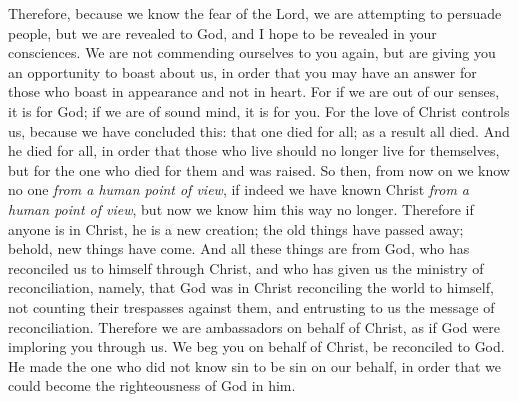 \begin{biblechapter}
 Therefore, because we know the fear of the Lord, we are attempting to persuade people, but we are revealed to God, and I hope to be revealed in your consciences.
\verse We are not commending ourselves to you again, but are giving you an opportunity to boast about us, in order that you may have an answer for those who boast in appearance and not in heart.
\verse For if we are out of our senses, it is for God; if we are of sound mind, it is for you.
\verse For the love of Christ controls us, because we have concluded this: that one died for all; as a result all died.
\verse And he died for all, in order that those who live should no longer live for themselves, but for the one who died for them and was raised.
\verse So then, from now on we know no one \textit{from a human point of view}, if indeed we have known Christ \textit{from a human point of view}, but now we know him this way no longer.
\verse Therefore if anyone is in Christ, he is a new creation; the old things have passed away; behold, new things have come.
\verse And all these things are from God, who has reconciled us to himself through Christ, and who has given us the ministry of reconciliation,
\verse namely, that God was in Christ reconciling the world to himself, not counting their trespasses against them, and entrusting to us the message of reconciliation.
\verse Therefore we are ambassadors on behalf of Christ, as if God were imploring you through us. We beg you on behalf of Christ, be reconciled to God.
\verse He made the one who did not know sin to be sin on our behalf, in order that we could become the righteousness of God in him.
\end{biblechapter}

